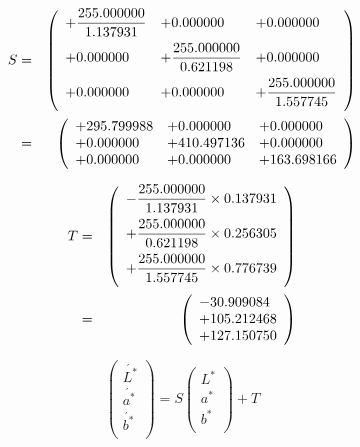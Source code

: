 \documentclass{article}
\begin{document}
\begin{eqnarray*} S &=& \left( \begin{array}{lll} +\dfrac{255.000000}{1.137931} & +0.000000 & +0.000000 \vspace{.5em} \\ +0.000000 & +\dfrac{255.000000}{0.621198} & +0.000000 \vspace{.5em} \\ +0.000000 & +0.000000 & +\dfrac{255.000000}{1.557745} \vspace{.5em} \\ \end{array} \right) \\ &=& \left( \begin{array}{lll} +295.799988 & +0.000000 & +0.000000 \\ +0.000000 & +410.497136 & +0.000000 \\ +0.000000 & +0.000000 & +163.698166 \\ \end{array} \right) \\ \end{eqnarray*}
\pagebreak

\begin{eqnarray*} T &=& \left( \begin{array}{l} -\dfrac{255.000000}{1.137931}\times 0.137931 \vspace{.5em} \\ +\dfrac{255.000000}{0.621198}\times 0.256305 \vspace{.5em} \\ +\dfrac{255.000000}{1.557745}\times 0.776739 \vspace{.5em} \\ \end{array} \right) \\ &=& \left( \begin{array}{lll} -30.909084 \\ +105.212468 \\ +127.150750 \\ \end{array} \right) \\ \end{eqnarray*}
\pagebreak

\[ \left( \begin{array}{l} \acute{L^{*}} \\ \acute{a^{*}} \\ \acute{b^{*}} \\ \end{array} \right) = S \left( \begin{array}{l} L^{*} \\ a^{*} \\ b^{*} \\ \end{array} \right) + T \]
\pagebreak
\end{document}
